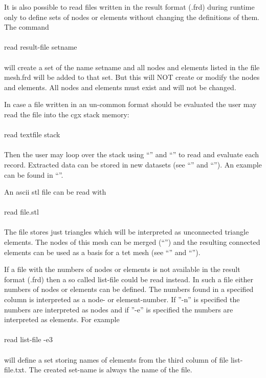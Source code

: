 \documentclass{article}
\begin{document}
It is also possible to read files written in the result format (.frd) during runtime only to define sets of nodes or elements without changing the definitions of them. The command\\\\read result-file setname\\\\will create a set of the name setname and all nodes and elements listed in the file mesh.frd will be added to that set. But this will NOT create or modify the nodes and elements. All nodes and elements must exist and will not be changed.

In case a file written in an un-common format should be evaluated the user may read the file into the cgx stack memory:\\\\read textfile stack\\\\ Then the user may loop over the stack using ``'' and ``'' to read and evaluate each record. Extracted data can be stored in new datasets (see ``'' and ``''). An example can be found in ``''.

An ascii stl file can be read with \\\\read file.stl\\\\ The file stores just triangles which will be interpreted as unconnected triangle elements. The nodes of this mesh can be merged (``'') and the resulting connected elements can be used as a basis for a tet mesh (see ``'' and ``'').

If a file with the numbers of nodes or elements is not available in the result format (.frd) then a so called list-file could be read instead. In such a file either numbers of nodes or elements can be defined. The numbers found in a specified column is interpreted as a node- or element-number. If ''-n'' is specified the numbers are interpreted as nodes and if ''-e'' is specified the numbers are interpreted as elements. For example\\\\read list-file -e3\\\\will define a set storing names of elements from the third column of file list-file.txt. The created set-name is always the name of the file.\\\\
\end{document}

